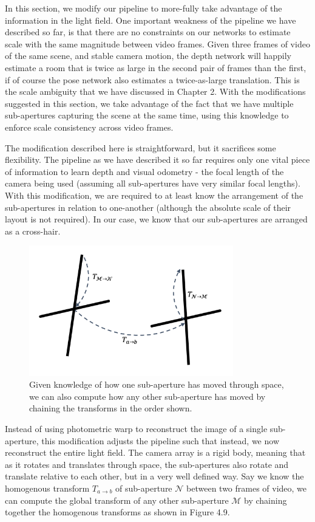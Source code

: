 In this section, we modify our pipeline to more-fully take advantage of the information in the light field. One important weakness of the pipeline we have described so far, is that there are no constraints on our networks to estimate scale with the same magnitude between video frames. Given three frames of video of the same scene, and stable camera motion, the depth network will happily estimate a room that is twice as large in the second pair of frames than the first, if of course the pose network also estimates a twice-as-large translation. This is the scale ambiguity that we have discussed in Chapter 2. With the modifications suggested in this section, we take advantage of the fact that we have multiple sub-apertures capturing the scene at the same time, using this knowledge to enforce scale consistency across video frames. 

The modification described here is straightforward, but it sacrifices some flexibility. The pipeline as we have described it so far requires only one vital piece of information to learn depth and visual odometry - the focal length of the camera being used (assuming all sub-apertures have very similar focal lengths). With this modification, we are required to at least know the arrangement of the sub-apertures in relation to one-another (although the absolute scale of their layout is not required). In our case, we know that our sub-apertures are arranged as a cross-hair. 

\begin{figure}[htbp]
    \centering 
    \includegraphics[width=3.5in]{images/relative_subapertures.png}
    \caption[The relationship between sub-apertures as the light field camera moves through space]{Given knowledge of how one sub-aperture has moved through space, we can also compute how any other sub-aperture has moved by chaining the transforms in the order shown.}
\end{figure}

Instead of using photometric warp to reconstruct the image of a single sub-aperture, this modification adjusts the pipeline such that instead, we now reconstruct the entire light field. The camera array is a rigid body, meaning that as it rotates and translates through space, the sub-apertures also rotate and translate relative to each other, but in a very well defined way. Say we know the homogenous transform  $T_{a \rightarrow b}$ of sub-aperture $\mathcal{N}$ between two frames of video, we can compute the global transform of any other sub-aperture $\mathcal{M}$ by chaining together the homogenous transforms as shown in Figure 4.9.

